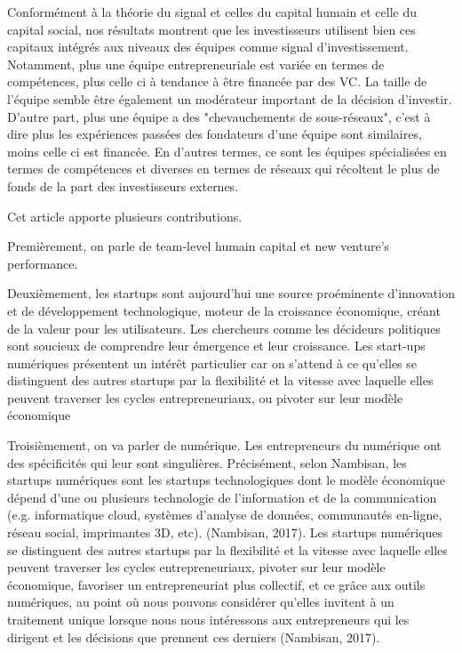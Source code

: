 \documentclass[12pt]{article}
\begin{document}
Conformément à la théorie du signal et celles du capital humain et celle du capital social, nos résultats montrent que les investisseurs utilisent bien ces capitaux intégrés aux niveaux des équipes comme signal d'investissement. Notamment, plus une équipe entrepreneuriale est variée en termes de compétences, plus celle ci à tendance à être financée par des VC. La taille de l'équipe semble être également un modérateur important de la décision d'investir. D'autre part, plus une équipe a des "chevauchements de sous-réseaux", c'est à dire plus les expériences passées des fondateurs d'une équipe sont similaires, moins celle ci est financée. En d'autres termes, ce sont les équipes spécialisées en termes de compétences et diverses en termes de réseaux qui récoltent le plus de fonds de la part des investisseurs externes.

Cet article apporte plusieurs contributions.

Premièrement, on parle de team-level humain capital et new venture's performance.

Deuxièmement, les startups sont aujourd'hui une source proéminente d'innovation et de développement technologique, moteur de la croissance économique, créant de la valeur pour les utilisateurs. Les chercheurs comme les décideurs politiques sont soucieux de comprendre leur émergence et leur croissance. Les start-ups numériques présentent un intérêt particulier car on s'attend à ce qu'elles se distinguent des autres startups par la flexibilité et la vitesse avec laquelle elles peuvent traverser les cycles entrepreneuriaux, ou pivoter sur leur modèle économique \citep{nambisan2017digital}



Troisièmement, on va parler de numérique. Les entrepreneurs du numérique ont des spécificités qui leur sont singulières. Précisément, selon Nambisan, les startups numériques sont les startups technologiques dont le modèle économique dépend d’une ou plusieurs technologie de l’information et de la communication (e.g. informatique cloud, systèmes d’analyse de données, communautés en-ligne, réseau social, imprimantes 3D, etc). (Nambisan, 2017). Les startups numériques se distinguent des autres startups par la flexibilité et la vitesse avec laquelle elles peuvent traverser les cycles entrepreneuriaux, pivoter sur leur modèle économique, favoriser un entrepreneuriat plus collectif, et ce grâce aux outils numériques, au point où nous pouvons considérer qu’elles invitent à un traitement unique lorsque nous nous intéressons aux entrepreneurs qui les dirigent et les décisions que prennent ces derniers (Nambisan, 2017).
\end{document}
